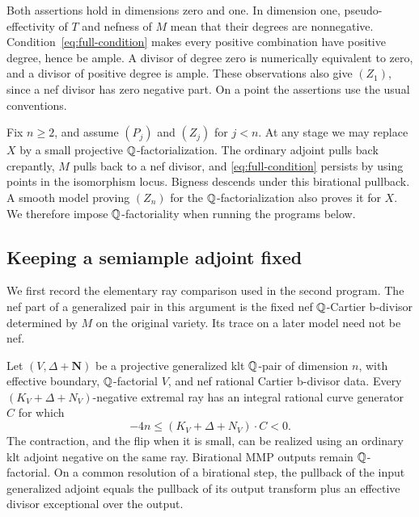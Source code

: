 Both assertions hold in dimensions zero and one.  In dimension one,
pseudo-effectivity of $T$ and nefness of $M$ mean that their degrees are
nonnegative.  Condition~\eqref{eq:full-condition} makes every positive
combination have positive degree, hence be ample.  A divisor of degree
zero is numerically equivalent to zero, and a divisor of positive degree
is ample.  These observations also give $(Z_1)$, since a nef divisor has
zero negative part.  On a point the assertions use the usual conventions.

Fix $n\geq2$, and assume $(P_j)$ and $(Z_j)$ for $j<n$.
At any stage we may replace $X$ by a small projective
$\mathbb Q$-factorialization.  The ordinary adjoint pulls back crepantly, $M$
pulls back to a nef divisor, and \eqref{eq:full-condition} persists by
using points in the isomorphism locus.  Bigness descends under this
birational pullback.  A smooth model proving $(Z_n)$ for the
$\mathbb Q$-factorialization also proves it for $X$.  We therefore impose
$\mathbb Q$-factoriality when running the programs below.

\subsection{Keeping a semiample adjoint fixed}

We first record the elementary ray comparison used in the second
program.  The nef part of a generalized pair in this argument is the
fixed nef $\mathbb Q$-Cartier b-divisor determined by $M$ on the original
variety.  Its trace on a later model need not be nef.

\begin{lemma}\label{lemma:generalized-ray-bound}
Let $(V,\Delta+\mathbf N)$ be a projective generalized klt $\mathbb Q$-pair
of dimension $n$, with effective boundary, $\mathbb Q$-factorial $V$, and nef
rational Cartier b-divisor data.  Every
$(K_V+\Delta+N_V)$-negative extremal ray has an integral rational curve
generator $C$ for which
\[
                -4n\leq (K_V+\Delta+N_V)\cdot C<0.
\]
The contraction, and the flip when it is small, can be realized using
an ordinary klt adjoint negative on the same ray.  Birational MMP
outputs remain $\mathbb Q$-factorial.  On a common resolution of a birational
step, the pullback of the input generalized adjoint equals the pullback
of its output transform plus an effective divisor exceptional over
the output.
\end{lemma}

